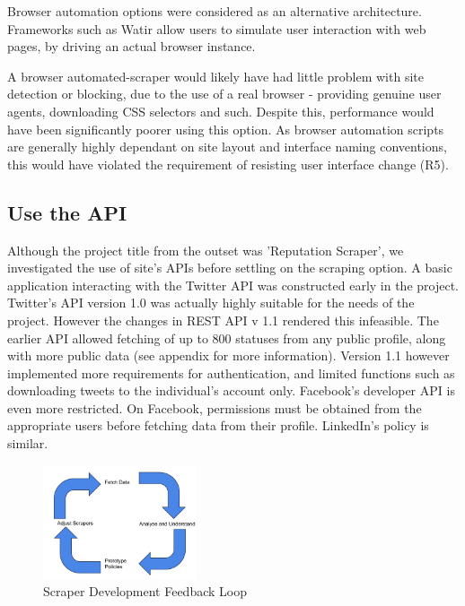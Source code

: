 Browser automation options were considered as an alternative architecture. Frameworks such as Watir allow users to simulate user interaction with web pages, by driving an actual browser instance.

A browser automated-scraper would likely have had little problem with site detection or blocking, due to the use of a real browser - providing genuine user agents, downloading CSS selectors and such. Despite this, performance would have been significantly poorer using this option. As browser automation scripts are generally highly dependant on site layout and interface naming conventions, this would have violated the requirement of resisting user interface change (R5). 

\subsection{Use the API}

Although the project title from the outset was 'Reputation Scraper', we investigated the use of site's APIs before settling on the scraping option. A basic application interacting with the Twitter API was constructed early in the project. Twitter's API version 1.0 was actually highly suitable for the needs of the project. However the changes in REST API v 1.1 rendered this infeasible. The earlier API allowed fetching of up to 800 statuses from any public profile, along with more public data (see appendix for more information). Version 1.1 however implemented more requirements for authentication, and limited functions such as downloading tweets to the individual's account only. Facebook's developer API is even more restricted. On Facebook, permissions must be obtained from the appropriate users before fetching data from their profile. LinkedIn's policy is similar. %

\begin{figure}[h!]
\centering
\includegraphics[width=0.4\textwidth]{Images/Implementation_Lifecycle.pdf}
\caption{Scraper Development Feedback Loop}
\end{figure}

